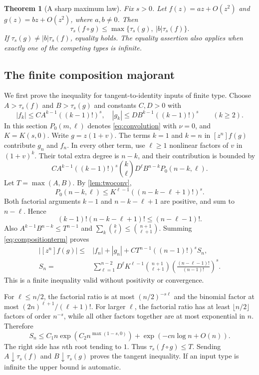 \documentclass[11pt,a4paper]{article}
\newtheorem{theorem}{Theorem}[section]
\theoremstyle{definition}
\theoremstyle{remark}
\newcommand{\typ}{\tau_s}
\numberwithin{equation}{section}
\begin{document}
\begin{theorem}[A sharp maximum law]\label{thm:composition}
Fix $s>0$. Let $f(z)=az+O(z^2)$ and $g(z)=bz+O(z^2)$, where
$a,b\ne0$. Then
\begin{equation}
 \typ(f\circ g)\le\max\{\typ(g),\ |b|\typ(f)\}.
 \label{eq:compositionbound}
\end{equation}
If $\typ(g)\ne |b|\typ(f)$, equality holds. The equality assertion
also applies when exactly one of the competing types is infinite.
\end{theorem}

\subsection{The finite composition majorant}
We first prove the inequality for tangent-to-identity inputs of finite
type. Choose $A>\typ(f)$ and $B>\typ(g)$ and constants $C,D>0$ with
\begin{equation}
 |f_k|\le CA^{k-1}((k-1)!)^s,\quad
 |g_k|\le DB^{k-1}((k-1)!)^s\qquad(k\ge2).
 \label{eq:compositioninputs}
\end{equation}
In this section $P_0(m,\ell)$ denotes \eqref{eq:convolution} with
$\nu=0$, and $K=K(s,0)$. Write $g=z(1+v)$.
The terms $k=1$ and $k=n$ in $[z^n]f(g)$ contribute $g_n$ and $f_n$.
In every other term, use $\ell\ge1$ nonlinear factors of $v$ in
$(1+v)^k$. Their total extra degree is $n-k$, and their contribution is
bounded by
\begin{equation}
 CA^{k-1}((k-1)!)^s\binom{k}{\ell}
       D^\ell B^{n-k}P_0(n-k,\ell).
 \label{eq:compositionterm}
\end{equation}
Let $T=\max(A,B)$. By \cref{lem:twoconv},
\[
 P_0(n-k,\ell)\le K^{\ell-1}((n-k-\ell+1)!)^s.
\]
Both factorial arguments $k-1$ and $n-k-\ell+1$ are positive, and
sum to $n-\ell$. Hence
\[
 (k-1)!(n-k-\ell+1)!\le(n-\ell-1)!.
\]
Also $A^{k-1}B^{n-k}\le T^{n-1}$ and
$\sum_k\binom{k}{\ell}\le\binom{n+1}{\ell+1}$.
Summing \eqref{eq:compositionterm} proves
\begin{align}
 |[z^n]f(g)|\le{}&|f_n|+|g_n|+
 C T^{n-1}((n-1)!)^s S_n,\label{eq:compositionfinite}\\
 S_n={}&\sum_{\ell=1}^{n-2}D^\ell K^{\ell-1}
 \binom{n+1}{\ell+1}
 \left(\frac{(n-\ell-1)!}{(n-1)!}\right)^s.
 \label{eq:Sn}
\end{align}
This is a finite inequality valid without positivity or convergence.

For $\ell\le n/2$, the factorial ratio is at most
$(n/2)^{-s\ell}$ and the binomial factor at most
$(2n)^{\ell+1}/(\ell+1)!$. For larger $\ell$, the factorial ratio
has at least $\lfloor n/2\rfloor$ factors of order $n^{-s}$, while
all other factors together are at most exponential in $n$. Therefore
\begin{equation}
 S_n\le C_1 n\exp(C_2 n^{\max(1-s,0)})+
               \exp(-c n\log n+O(n)).
 \label{eq:Snbound}
\end{equation}
The right side has $n$th root tending to $1$. Thus
$\typ(f\circ g)\le T$. Sending $A\downarrow\typ(f)$ and
$B\downarrow\typ(g)$ proves the tangent inequality. If an input type
is infinite the upper bound is automatic.
\end{document}
